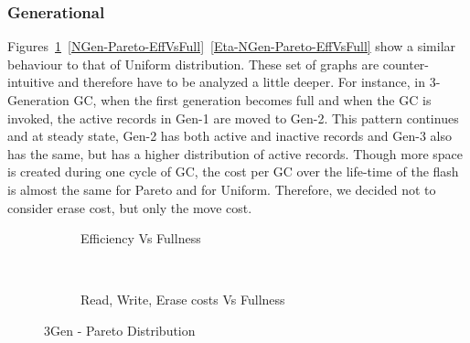 \subsubsection{Generational}

Figures~\ref{3Gen-Pareto-EffVsFull}~\ref{NGen-Pareto-EffVsFull}~\ref{Eta-NGen-Pareto-EffVsFull} show a similar behaviour to that of Uniform distribution. These set of graphs are counter-intuitive and therefore have to be analyzed a little deeper. For instance, in 3-Generation GC, when the first generation becomes full and when the GC is invoked, the active records in Gen-1 are moved to Gen-2. This pattern continues and at steady state, Gen-2 has both active and inactive records and Gen-3 also has the same, but has a higher distribution of active records. Though more space is created during one cycle of GC, the cost per GC over the life-time of the flash is almost the same for Pareto and for Uniform. Therefore, we decided not to consider erase cost, but only the move cost. 

\begin{figure}[H]
        \centering
        \begin{subfigure}[b]{0.4\textwidth}
                \centering
                \caption{Efficiency Vs Fullness} \label{3Gen-Pareto-EffVsFull}
        \end{subfigure}
        ~~~ %
        \begin{subfigure}[b]{0.4\textwidth}
                \centering
                \caption{Read, Write, Erase costs Vs Fullness} \label{3Gen-Pareto-RdWrEraseVsFull}
        \end{subfigure}
        \caption{3Gen - Pareto Distribution}
\end{figure}




